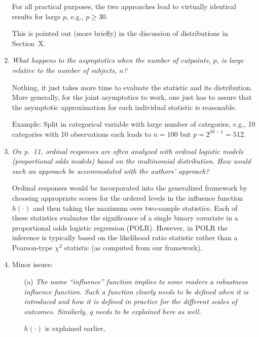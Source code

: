 \documentclass[11pt,a4paper]{article}
\begin{document}
\begin{enumerate}
	For all practical purposes, the two approaches lead to virtually identical results for
	large $p$, e.g., $p \ge 30$.
	
	This is pointed out (more briefly) in the discussion of distributions in Section~X.
		
  \item \textit{What happens to the asymptotics when the number of cutpoints, $p$,
        is large relative to the number of subjects, $n$?}
	
	Nothing, it just takes more time to evaluate the statistic and its distribution.	
        More generally, for the joint asymptotics to work, one just has to assure that the
	asymptotic approximation for each individual statistic is reasonable.

	Example: Split in categorical variable with large number of categories, e.g.,
	10 categories with 10 observations each leads to $n = 100$ but
	$p = 2^{10 - 1} = 512$.
	
  \item \textit{On p.~11, ordinal responses are often analyzed with ordinal
        logistic models (proportional odds models) based on the multinomial
	distribution. How would such an approach be accommodated with the
	authors' approach?}
	
	Ordinal responses would be incorporated into the generalized framework
	by choosing appropriate scores for the ordered levels in the influence
	function $h(\cdot)$ and then taking the maximum over two-sample statistics.
	Each of these statistics evaluates the significance of a single binary
	covariate in a proportional odds logistic regression (POLR). However, in
	POLR the inference is typically based on the likelihood ratio statistic
	rather than a Pearson-type $\chi^2$ statistic (as computed from our
	framework).
	
  \item Minor issues:
  
  \begin{itemize}
  
    \item[(a)] \textit{The name ``influence'' function implies to some readers a
               robustness influence function. Such a function clearly needs to be
	       defined when it is introduced and how it is defined in practice
	       for the different scales of outcomes. Similarly, $q$ needs to be
	       explained here as well.}
	       
	       $h(\cdot)$ is explained earlier, 
	       

\end{itemize}
\end{enumerate}
\end{document}
